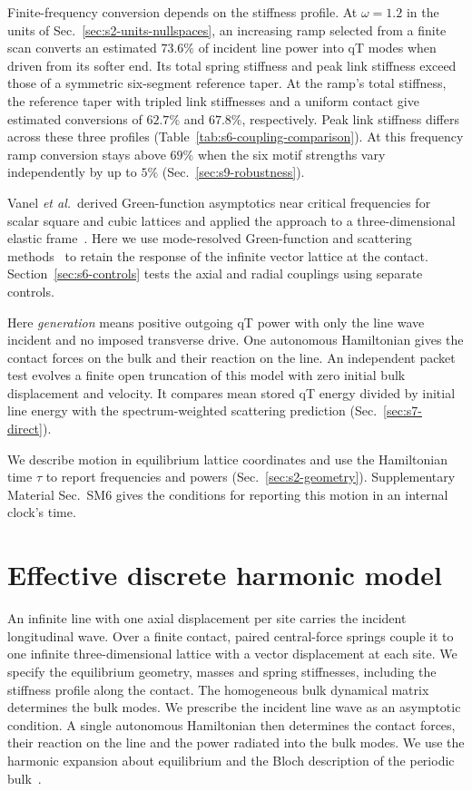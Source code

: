 \documentclass[10pt,aps,onecolumn,floatfix,notitlepage,nofootinbib,showkeys]{revtex4-2}
\begin{document}
Finite-frequency conversion depends on the stiffness profile. At $\omega=1.2$ in the units of Sec.~\ref{sec:s2-units-nullspaces}, an increasing ramp selected from a finite scan converts an estimated $73.6\%$ of incident line power into qT modes when driven from its softer end. Its total spring stiffness and peak link stiffness exceed those of a symmetric six-segment reference taper. At the ramp's total stiffness, the reference taper with tripled link stiffnesses and a uniform contact give estimated conversions of $62.7\%$ and $67.8\%$, respectively. Peak link stiffness differs across these three profiles (Table~\ref{tab:s6-coupling-comparison}). At this frequency ramp conversion stays above $69\%$ when the six motif strengths vary independently by up to $5\%$ (Sec.~\ref{sec:s9-robustness}).

Vanel \textit{et al.}\ derived Green-function asymptotics near critical frequencies for scalar square and cubic lattices and applied the approach to a three-dimensional elastic frame~\cite{Vanel2016}. Here we use mode-resolved Green-function and scattering methods~\cite{Ong2018,Sadasivam2017,Khodavirdi2024} to retain the response of the infinite vector lattice at the contact. Section~\ref{sec:s6-controls} tests the axial and radial couplings using separate controls.

Here \emph{generation} means positive outgoing qT power with only the line wave incident and no imposed transverse drive. One autonomous Hamiltonian gives the contact forces on the bulk and their reaction on the line. An independent packet test evolves a finite open truncation of this model with zero initial bulk displacement and velocity. It compares mean stored qT energy divided by initial line energy with the spectrum-weighted scattering prediction (Sec.~\ref{sec:s7-direct}).

We describe motion in equilibrium lattice coordinates and use the Hamiltonian time $\tau$ to report frequencies and powers (Sec.~\ref{sec:s2-geometry}). Supplementary Material Sec.~SM6 gives the conditions for reporting this motion in an internal clock's time.

\section{Effective discrete harmonic model}
\label{sec:s2-model}

An infinite line with one axial displacement per site carries the incident longitudinal wave. Over a finite contact, paired central-force springs couple it to one infinite three-dimensional lattice with a vector displacement at each site. We specify the equilibrium geometry, masses and spring stiffnesses, including the stiffness profile along the contact. The homogeneous bulk dynamical matrix determines the bulk modes. We prescribe the incident line wave as an asymptotic condition. A single autonomous Hamiltonian then determines the contact forces, their reaction on the line and the power radiated into the bulk modes. We use the harmonic expansion about equilibrium and the Bloch description of the periodic bulk~\cite{BornHuang1954,Maradudin1971}.
\end{document}
